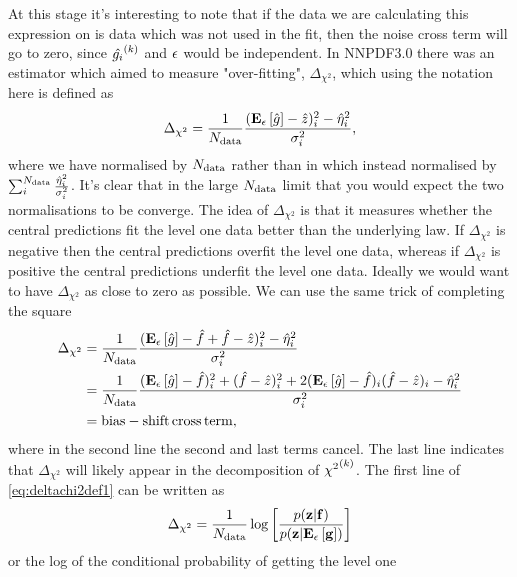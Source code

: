 At this stage it's interesting to note that if the data we are calculating this
expression on is data which was not used in the fit, then the noise cross term
will go to zero, since $\hat{g_i}^{(k)}$ and $\epsilon$ would be
independent. In NNPDF3.0 there was an estimator which aimed to measure
"over-fitting", $\Delta_{\chi^2}$, which using the notation here is defined as
\begin{equation}\label{eq:deltachi2def1}
    \Delta_{\chi^2} = \frac{1}{N_{\rm data}}\frac{(\mathbf{E}_{\epsilon}\left[ \hat{g} \right] - \hat{z})_i^2 - \hat{\eta}_i^2}{\sigma^{2}_i},
\end{equation}
where we have normalised by $N_{\rm data}$ rather than in \cite{nnpdf30} which instead normalised
by $\sum_i^{N_{\rm data}} \frac{\hat{\eta}_i^2}{\sigma^{2}_i}$. It's clear that in the large
$N_{\rm data}$ limit that you would expect the two normalisations to be converge. The
idea of $\Delta_{\chi^2}$ is that it measures whether the central predictions
fit the level one data better than the underlying law. If $\Delta_{\chi^2}$
is negative then the central predictions overfit the level one data, whereas
if $\Delta_{\chi^2}$ is positive the central predictions underfit the level one
data. Ideally we would want to have $\Delta_{\chi^2}$ as close to zero as possible.
We can use the same trick of completing the square
\begin{equation}\label{eq:deltachi2def}
    \begin{split}
        \Delta_{\chi^2} &= \frac{1}{N_{\rm data}}\frac{(\mathbf{E}_{\epsilon}\left[ \hat{g} \right] - \hat{f} + \hat{f} - \hat{z})_i^2 - \hat{\eta}_i^2}{\sigma^{2}_i} \\
        &= \frac{1}{N_{\rm data}}\frac{(\mathbf{E}_{\epsilon}\left[ \hat{g} \right] - \hat{f})_i^2 + (\hat{f} - \hat{z})_i^2 + 2(\mathbf{E}_{\epsilon}\left[ \hat{g} \right] - \hat{f})_i(\hat{f} - \hat{z})_i - \hat{\eta}_i^2}{\sigma^{2}_i} \\
        &= {\rm bias} - {\rm shift \, cross \, term},
    \end{split}
\end{equation}
where in the second line the second and last terms cancel. The last line indicates
that $\Delta_{\chi^2}$ will likely appear in the decomposition of ${\chi^2}^{(k)}$.
The first line of \eqref{eq:deltachi2def1} can be written as
\begin{equation}
    \Delta_{\chi^2} = \frac{1}{N_{\rm data}}\log \left[ \frac{p(\mathbf{z}| \mathbf{f})}{p(\mathbf{z}| \mathbf{E}_{\epsilon}\left[ \mathbf{g} \right])} \right]
\end{equation}
or the log of the conditional probability of getting the level one
